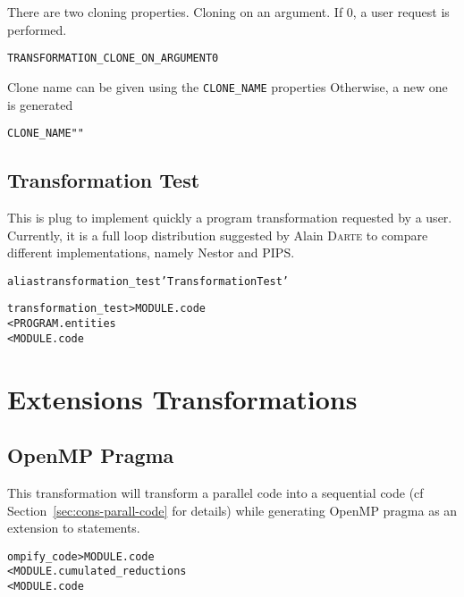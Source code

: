 \documentclass[a4paper]{report}
\newenvironment{PipsProp}{\begin{alltt}}{\end{alltt}}
\newenvironment{PipsMake}{\begin{alltt}}{\end{alltt}}
\begin{document}
There are two cloning properties.
Cloning on an argument. If 0, a user request is performed.

\begin{PipsProp}
TRANSFORMATION_CLONE_ON_ARGUMENT 0
\end{PipsProp}

Clone name can be given using the \lstinline|CLONE_NAME| properties
Otherwise, a new one is generated
\begin{PipsProp}
CLONE_NAME ""
\end{PipsProp}



\subsection{Transformation Test}
\label{subsection-transformation_test}

This is plug to implement quickly a program transformation requested by a
user. Currently, it is a full loop distribution suggested by Alain \textsc{Darte}
to compare different implementations, namely Nestor and PIPS.
\begin{PipsMake}
alias transformation_test 'Transformation Test'

transformation_test    > MODULE.code
        < PROGRAM.entities
        < MODULE.code
\end{PipsMake}


\section{Extensions Transformations}
\label{section-extensions_transformations}

\subsection {OpenMP Pragma}
\label{subsection-open_mp_pragma}
This transformation will transform a parallel code into a sequential code
(cf Section~\ref{sec:cons-parall-code} for details) while generating
OpenMP pragma as an extension to statements.

\begin{PipsMake}
ompify_code             > MODULE.code
        < MODULE.cumulated_reductions
        < MODULE.code

\end{PipsMake}
\end{document}
